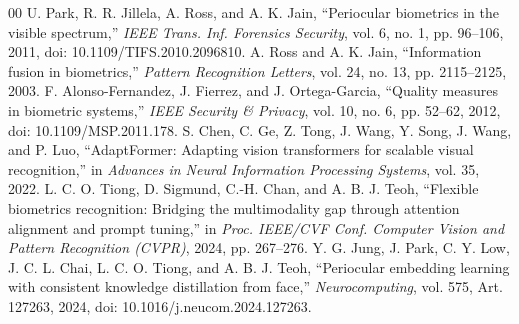 \documentclass[10pt,journal,compsoc]{IEEEtran}
\begin{document}
\begin{thebibliography}{00}
 U. Park, R. R. Jillela, A. Ross, and A. K. Jain, ``Periocular biometrics in the visible spectrum,'' \textit{IEEE Trans. Inf. Forensics Security}, vol. 6, no. 1, pp. 96--106, 2011, doi: 10.1109/TIFS.2010.2096810.
 A. Ross and A. K. Jain, ``Information fusion in biometrics,'' \textit{Pattern Recognition Letters}, vol. 24, no. 13, pp. 2115--2125, 2003.
 F. Alonso-Fernandez, J. Fierrez, and J. Ortega-Garcia, ``Quality measures in biometric systems,'' \textit{IEEE Security \& Privacy}, vol. 10, no. 6, pp. 52--62, 2012, doi: 10.1109/MSP.2011.178.
 S. Chen, C. Ge, Z. Tong, J. Wang, Y. Song, J. Wang, and P. Luo, ``AdaptFormer: Adapting vision transformers for scalable visual recognition,'' in \textit{Advances in Neural Information Processing Systems}, vol. 35, 2022.
 L. C. O. Tiong, D. Sigmund, C.-H. Chan, and A. B. J. Teoh, ``Flexible biometrics recognition: Bridging the multimodality gap through attention alignment and prompt tuning,'' in \textit{Proc. IEEE/CVF Conf. Computer Vision and Pattern Recognition (CVPR)}, 2024, pp. 267--276.
 Y. G. Jung, J. Park, C. Y. Low, J. C. L. Chai, L. C. O. Tiong, and A. B. J. Teoh, ``Periocular embedding learning with consistent knowledge distillation from face,'' \textit{Neurocomputing}, vol. 575, Art. 127263, 2024, doi: 10.1016/j.neucom.2024.127263.
\end{thebibliography}
\end{document}
